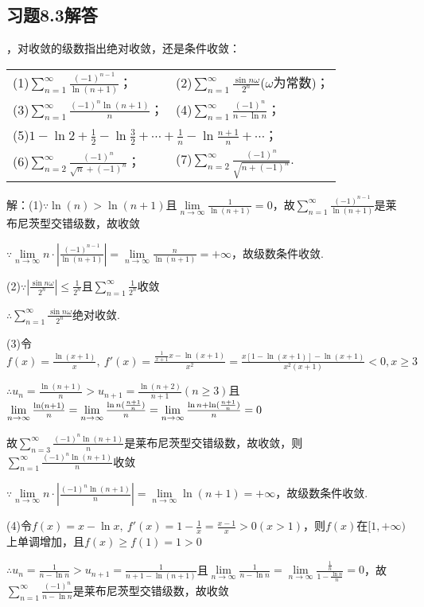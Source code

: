 \documentclass[12pt,UTF8]{ctexart}
\newcommand\Lim[0]{\lim\limits_{n\rightarrow\infty}}
\newcommand\Ser[1]{\sum_{n=#1}^\infty}
\begin{document}
\subsection{习题8.3解答}
\begin{enumerate}
，对收敛的级数指出绝对收敛，还是条件收敛：
\newline
\begin{tabular}{ll}
(1)$\sum_{n=1}^\infty\frac{(-1)^{n-1}}{\ln(n+1)}$；&(2)$\sum_{n=1}^\infty\frac{\sin n\omega}{2^n}$($\omega$为常数)；\\
(3)$\sum_{n=1}^\infty\frac{(-1)^n\ln(n+1)}n$；&(4)$\sum_{n=1}^\infty\frac{(-1)^n}{n-\ln n}$；\\
\multicolumn{2}{l}{(5)$1-\ln2+\frac12-\ln\frac32+\cdots+\frac1n-\ln\frac{n+1}n+\cdots$；}\\
(6)$\sum_{n=2}^\infty\frac{(-1)^n}{\sqrt n+(-1)^n}$；&(7)$\sum_{n=2}^\infty\frac{(-1)^n}{\sqrt{n+(-1)^n}}$.
\end{tabular}

解：(1)$\because\ln(n)>\ln(n+1)$且$\Lim\frac1{\ln(n+1)}=0$，故$\Ser{1}\frac{(-1)^{n-1}}{\ln(n+1)}$是莱布尼茨型交错级数，故收敛

$\because\Lim n\cdot|\frac{(-1)^{n-1}}{\ln(n+1)}|=\Lim\frac n{\ln(n+1)}=+\infty$，故级数条件收敛.

(2)$\because|\frac{\sin n\omega}{2^n}|\leq\frac1{2^n}$且$\Ser{1}\frac1{2^n}$收敛

$\therefore\Ser{1}\frac{\sin n\omega}{2^n}$绝对收敛.

(3)令$f(x)=\frac{\ln(x+1)}x,\ f'(x)=\frac{\frac1{x+1}x-\ln(x+1)}{x^2}=\frac{x[1-\ln(x+1)]-\ln(x+1)}{x^2(x+1)}<0,x\geq3$

$\therefore u_n=\frac{\ln(n+1)}n>u_{n+1}=\frac{\ln(n+2)}{n+1}(n\geq3)$且$\Lim\frac{\ln(n+1)}n=\Lim\frac{\ln n(\frac{n+1}n)}n=\Lim\frac{\ln n+\ln(\frac{n+1}n)}n\\
=0$

故$\Ser{3}\frac{(-1)^n\ln(n+1)}n$是莱布尼茨型交错级数，故收敛，则$\Ser{1}\frac{(-1)^n\ln(n+1)}n$收敛

$\because\Lim n\cdot|\frac{(-1)^n\ln(n+1)}n|=\Lim\ln(n+1)=+\infty$，故级数条件收敛.

(4)令$f(x)=x-\ln x,\ f'(x)=1-\frac1x=\frac{x-1}x>0(x>1)$，则$f(x)$在$[1,+\infty)$上单调增加，且$f(x)\geq f(1)=1>0$

$\therefore u_n=\frac1{n-\ln n}>u_{n+1}=\frac1{n+1-\ln(n+1)}$且$\Lim\frac1{n-\ln n}=\Lim\frac{\frac1n}{1-\frac{\ln n}n}=0$，故$\sum_{n=1}^\infty\frac{(-1)^n}{n-\ln n}$是莱布尼茨型交错级数，故收敛


\end{enumerate}
\end{document}
